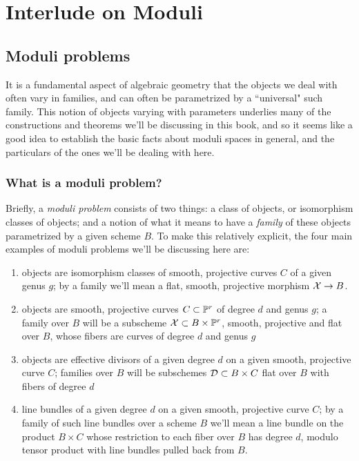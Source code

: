 

\chapter{Interlude on Moduli}
\label{Moduli chapter}

\section{Moduli problems}

It is a fundamental aspect of algebraic geometry that the objects we deal with often vary in families, and can often be parametrized by a ``universal" such family. This notion of objects varying with parameters underlies many of the constructions and theorems we'll be discussing in this book, and so it seems like a good idea to establish the basic facts about moduli spaces in general, and the particulars of the ones we'll be dealing with here.

\subsection{What is a moduli problem?}

Briefly, a \emph{moduli problem} consists of two things: a class of objects, or isomorphism classes of objects; and a notion of what it means to have a \emph{family} of these objects parametrized by a given scheme $B$. To make this relatively explicit, the four main examples of moduli problems we'll be discussing here are:

\begin{enumerate}
\item objects are isomorphism classes  of smooth, projective curves $C$ of a given genus $g$; by a family we'll mean a flat, smooth, projective morphism ${\mathcal X} \to B$.

\item objects are smooth, projective curves $C \subset {\mathbb P}^r$ of degree $d$ and genus $g$; a family over $B$ will be a subscheme ${\mathcal X} \subset B \times {\mathbb P}^r$, smooth, projective and flat over $B$, whose fibers are curves of degree $d$ and genus $g$

\item objects are effective divisors of a given degree $d$ on a given smooth, projective curve $C$; families over $B$ will be subschemes ${\cal D} \subset B \times C$ flat over $B$ with fibers of degree $d$

\item line bundles of a given degree $d$ on a given smooth, projective curve $C$; by a family of such line bundles over a scheme $B$ we'll mean a line bundle on the product $B \times C$ whose restriction to each fiber over $B$ has degree $d$, modulo tensor product with line bundles pulled back from $B$.
\end{enumerate}

